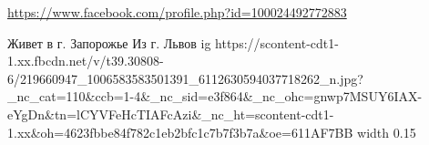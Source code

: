  
 
 
 
 

\url{https://www.facebook.com/profile.php?id=100024492772883}\par
Живет в г. Запорожье
Из г. Львов
\ifcmt
  ig https://scontent-cdt1-1.xx.fbcdn.net/v/t39.30808-6/219660947_1006583583501391_6112630594037718262_n.jpg?_nc_cat=110&ccb=1-4&_nc_sid=e3f864&_nc_ohc=gnwp7MSUY6IAX-eYgDn&tn=lCYVFeHcTIAFcAzi&_nc_ht=scontent-cdt1-1.xx&oh=4623fbbe84f782c1eb2bfc1c7b7f3b7a&oe=611AF7BB
  width 0.15
\fi

